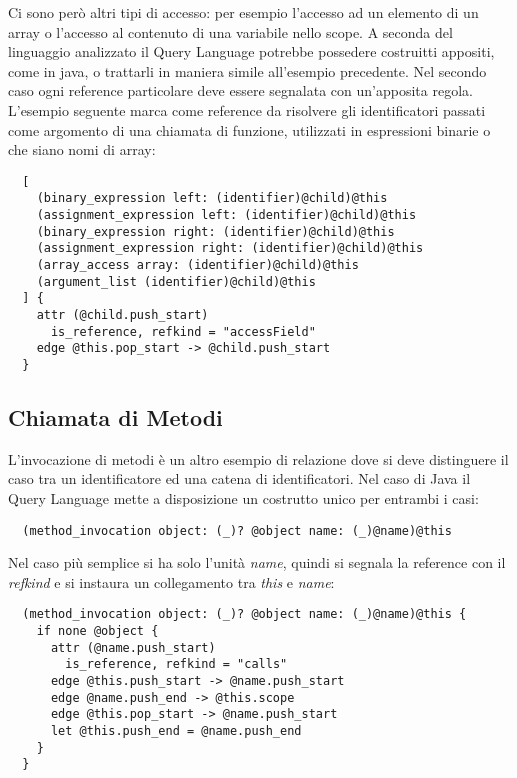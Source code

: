 Ci sono per\`o altri tipi di accesso: per esempio l'accesso ad un elemento di un array o l'accesso al contenuto di una variabile nello scope. A seconda del linguaggio analizzato il Query Language potrebbe possedere costruitti appositi, come in java, o trattarli in maniera simile all'esempio precedente.
Nel secondo caso ogni reference particolare deve essere segnalata con un'apposita regola.
L'esempio seguente marca come reference da risolvere gli identificatori passati come argomento di una chiamata di funzione, utilizzati in espressioni binarie o che siano nomi di array:

\begin{lstlisting}
  [
    (binary_expression left: (identifier)@child)@this
    (assignment_expression left: (identifier)@child)@this
    (binary_expression right: (identifier)@child)@this
    (assignment_expression right: (identifier)@child)@this
    (array_access array: (identifier)@child)@this
    (argument_list (identifier)@child)@this
  ] {
    attr (@child.push_start)
      is_reference, refkind = "accessField"
    edge @this.pop_start -> @child.push_start
  }
\end{lstlisting}

\subsection{Chiamata di Metodi}

L'invocazione di metodi \`e un altro esempio di relazione dove si deve distinguere il caso tra un identificatore ed una catena di identificatori. Nel caso di Java il Query Language mette a disposizione un costrutto unico per entrambi i casi:

\begin{lstlisting}
  (method_invocation object: (_)? @object name: (_)@name)@this
\end{lstlisting}

Nel caso pi\`u semplice si ha solo l'unit\`a \emph{name}, quindi si segnala la reference con il \emph{refkind} e si instaura un collegamento tra \emph{this} e \emph{name}:

\begin{lstlisting}
  (method_invocation object: (_)? @object name: (_)@name)@this {
    if none @object {
      attr (@name.push_start)
        is_reference, refkind = "calls"
      edge @this.push_start -> @name.push_start
      edge @name.push_end -> @this.scope
      edge @this.pop_start -> @name.push_start
      let @this.push_end = @name.push_end
    }
  }
\end{lstlisting}

